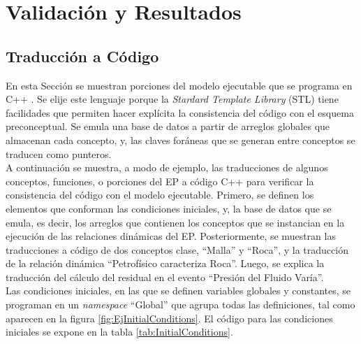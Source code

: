 \chapter{Validación y Resultados}\label{cap:Validacion}

\section{Traducción a Código}
En esta Sección se muestran porciones del modelo ejecutable que se programa en C++ \citep{ISO:2017:IIIa}. Se elije este lenguaje porque la \textit{Stardard Template Library} (STL) tiene facilidades que permiten hacer explícita la consistencia del código con el esquema preconceptual. Se emula una base de datos a partir de arreglos globales que almacenan cada concepto, y, las claves foráneas que se generan entre conceptos se traducen como punteros. \\

A continuación se muestra, a modo de ejemplo, las traducciones de algunos conceptos, funciones, o porciones del EP a código C++ para verificar la consistencia del código con el modelo ejecutable. Primero, se definen los elementos que conforman las condiciones iniciales, y, la base de datos que se emula, es decir, los arreglos que contienen los conceptos que se instancian en la ejecución de las relaciones dinámicas del EP. Posteriormente, se muestran las traducciones a código de dos conceptos clase, ``Malla'' y ``Roca'', y la traducción de la relación dinámica ``Petrofísico caracteriza Roca''. Luego, se explica la traducción del cálculo del residual en el evento ``Presión del Fluido Varía''.\\

Las condiciones iniciales, en las que se definen variables globales y constantes, se programan en un \textit{namespace} ``Global'' que agrupa todas las definiciones, tal como aparecen en la figura \ref{fig:EjInitialConditions}. El código para las condiciones iniciales se expone en la tabla \ref{tab:InitialConditions}.\\

